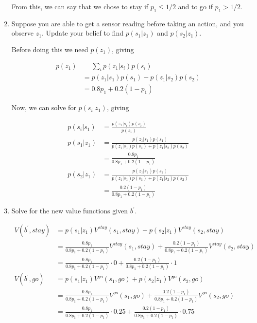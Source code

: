\documentclass[12pt]{article}
\begin{document}
\begin{enumerate}
From this, we can say that we chose to stay if $p_{1} \leq 1/2$ and to go if $p_{1}>1/2$. 

\item Suppose you are able to get a sensor reading before taking an
  action, and you observe $z_1$.  Update your belief to find $p(s_1 |
  z_1)$ and $p(s_2 | z_1)$.

  Before doing this we need $p(z_{1})$, giving

  \begin{align*}
    p(z_{1}) &= \sum_{i}p(z_{1}|s_{i})p(s_{i})\\
            &= p(z_{1}|s_{1})p(s_{1}) + p(z_{1}|s_{2})p(s_{2})\\
            &= 0.8p_{1} + 0.2(1 - p_{1})
  \end{align*}

  Now, we can solve for $p(s_{i}|z_{1})$, giving

  \begin{align*}
    p(s_{i}|s_{1}) &= \frac{p(z_{1}|s_{i})p(s_{i})}{p(z_{1})}\\
    p(s_{1}|z_{1}) &= \frac{p(z_{1}|s_{1})p(s_{1})}{p(z_{1}|s_{1})p(s_{1}) + p(z_{1}|s_{2})p(s_{2})}\\
                  &= \frac{0.8p_{1}}{0.8p_{1} + 0.2(1-p_{1})}\\
    p(s_{2}|z_{1}) &= \frac{p(z_{1}|s_{2})p(s_{2})}{p(z_{1}|s_{1})p(s_{1}) + p(z_{1}|s_{2})p(s_{2})}\\
                  &= \frac{0.2(1 - p_{1})}{0.8p_{1} + 0.2(1-p_{1})}
    \end{align*}

\item Solve for the new value functions given $b^{\prime}$.

\begin{align*}
  V(b^{\prime},stay) &= p(s_{1}|z_{1}) V^{stay}(s_{1},stay) + p(s_{2}|z_{1})V^{stay}(s_{2},stay)\\
                   &= \frac{0.8p_{1}}{0.8p_{1} + 0.2(1-p_{1})}V^{stay}(s_{1},stay) + \frac{0.2(1 - p_{1})}{0.8p_{1} + 0.2(1-p_{1})}V^{stay}(s_{2},stay)\\
                   &= \frac{0.8p_{1}}{0.8p_{1} + 0.2(1-p_{1})}\cdot 0 + \frac{0.2(1 - p_{1})}{0.8p_{1} + 0.2(1-p_{1})} \cdot 1\\
  V(b^{\prime},go) &= p(s_{1}|z_{1}) V^{go}(s_{1},go) + p(s_{2}|z_{1})V^{go}(s_{2},go)\\
                 &= \frac{0.8p_{1}}{0.8p_{1} + 0.2(1-p_{1})}V^{go}(s_{1},go) + \frac{0.2(1 - p_{1})}{0.8p_{1} + 0.2(1-p_{1})}V^{go}(s_{2},go)\\
&= \frac{0.8p_{1}}{0.8p_{1} + 0.2(1-p_{1})}\cdot 0.25 + \frac{0.2(1 - p_{1})}{0.8p_{1} + 0.2(1-p_{1})} \cdot 0.75
\end{align*}

\end{enumerate}
 
\end{document}
